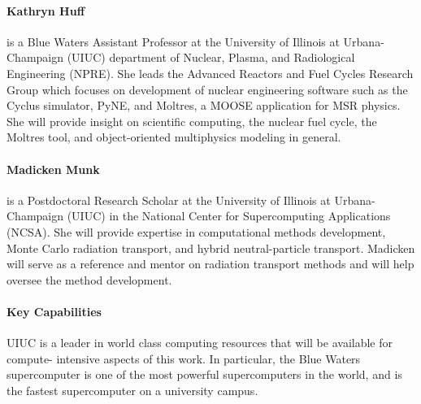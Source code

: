 \documentclass[letterpaper,12pt]{article}
\begin{document}
\paragraph{Kathryn Huff} is a Blue Waters Assistant Professor at the University
of Illinois at Urbana-Champaign (UIUC) department of Nuclear, Plasma, and
Radiological Engineering (NPRE). She leads the Advanced Reactors and Fuel
Cycles Research Group which focuses on development of nuclear engineering
software such as the Cyclus simulator, PyNE, and Moltres, a MOOSE application
for MSR physics. She will provide insight on scientific computing, the nuclear
fuel cycle, the Moltres tool, and object-oriented multiphysics modeling in
general.

\paragraph{Madicken Munk} is a Postdoctoral Research Scholar at the University
of Illinois at Urbana-Champaign (UIUC) in the National Center for Supercomputing
Applications (NCSA). She will provide expertise in computational methods
development, Monte Carlo radiation transport, and hybrid neutral-particle
transport. Madicken will serve as a reference and mentor on radiation transport
methods and will help oversee the method development.

\paragraph{Key Capabilities}

UIUC is a leader in world class computing resources that will be available for compute-
intensive aspects of this work. In particular, the Blue Waters supercomputer is
one of the most powerful supercomputers in the world, and is the fastest
supercomputer on a university campus.
\pagebreak


\end{document}
